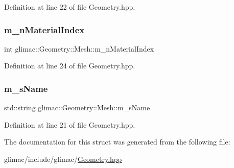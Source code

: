 Definition at line 22 of file Geometry.\+hpp.

\mbox{\label{structglimac_1_1_geometry_1_1_mesh_a5ca9239ca2a5af322a87c259824557e8}} 
\subsubsection{\texorpdfstring{m\+\_\+n\+Material\+Index}{m\_nMaterialIndex}}
{\footnotesize\ttfamily int glimac\+::\+Geometry\+::\+Mesh\+::m\+\_\+n\+Material\+Index}



Definition at line 24 of file Geometry.\+hpp.

\mbox{\label{structglimac_1_1_geometry_1_1_mesh_a46cc4ac1ecfdf763e2512c27a2155277}} 
\subsubsection{\texorpdfstring{m\+\_\+s\+Name}{m\_sName}}
{\footnotesize\ttfamily std\+::string glimac\+::\+Geometry\+::\+Mesh\+::m\+\_\+s\+Name}



Definition at line 21 of file Geometry.\+hpp.



The documentation for this struct was generated from the following file\+:\begin{DoxyCompactItemize}
\item 
glimac/include/glimac/\hyperlink{_geometry_8hpp}{Geometry.\+hpp}\end{DoxyCompactItemize}
